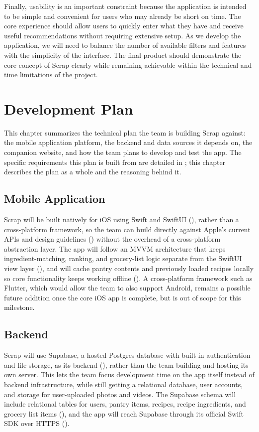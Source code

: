 Finally, usability is an important constraint because the application is intended to be simple and convenient for users who may already be short on time. The core experience should allow users to quickly enter what they have and receive useful recommendations without requiring extensive setup. As we develop the application, we will need to balance the number of available filters and features with the simplicity of the interface. The final product should demonstrate the core concept of Scrap clearly while remaining achievable within the technical and time limitations of the project.

\chapter{Development Plan}
This chapter summarizes the technical plan the team is building Scrap against: the mobile application platform, the backend and data sources it depends on, the companion website, and how the team plans to develop and test the app. The specific requirements this plan is built from are detailed in ; this chapter describes the plan as a whole and the reasoning behind it.

\section{Mobile Application}
Scrap will be built natively for iOS using Swift and SwiftUI \cite{AppleSwiftUIDocs} (), rather than a cross-platform framework, so the team can build directly against Apple's current APIs and design guidelines () without the overhead of a cross-platform abstraction layer. The app will follow an MVVM architecture that keeps ingredient-matching, ranking, and grocery-list logic separate from the SwiftUI view layer (), and will cache pantry contents and previously loaded recipes locally so core functionality keeps working offline (). A cross-platform framework such as Flutter, which would allow the team to also support Android, remains a possible future addition once the core iOS app is complete, but is out of scope for this milestone.

\section{Backend}
Scrap will use Supabase, a hosted Postgres database with built-in authentication and file storage, as its backend (), rather than the team building and hosting its own server. This lets the team focus development time on the app itself instead of backend infrastructure, while still getting a relational database, user accounts, and storage for user-uploaded photos and videos. The Supabase schema will include relational tables for users, pantry items, recipes, recipe ingredients, and grocery list items (), and the app will reach Supabase through its official Swift SDK over HTTPS \cite{SupabaseiOSQuickstart} ().

